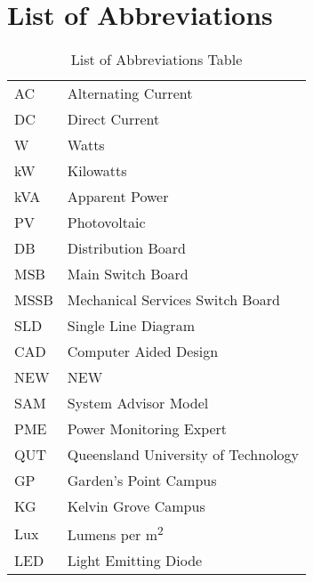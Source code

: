 
\section{List of Abbreviations}

\begin{table}[H]
	\centering
	\begin{tabular}{p{8cm}p{8cm}}
		AC   & Alternating Current              \\
		DC   & Direct Current                   \\
		W    & Watts                            \\
		kW   & Kilowatts                        \\
		kVA  & Apparent Power                   \\
		PV   & Photovoltaic                     \\
		DB   & Distribution Board               \\
		MSB  & Main Switch Board                \\
		MSSB & Mechanical Services Switch Board \\
		SLD  & Single Line Diagram              \\
		CAD  & Computer Aided Design            \\
		NEW  & NEW                   			\\
		SAM  & System Advisor Model    			\\
		PME  & Power Monitoring Expert          \\
		QUT  & Queensland University of Technology       \\
		GP   & Garden's Point Campus            \\
		KG   & Kelvin Grove Campus              \\
		Lux  & Lumens per \si{m^2}              \\
		LED  & Light Emitting Diode            
	\end{tabular}
	\caption{List of Abbreviations Table}
	\label{table:abbreviations}
\end{table}